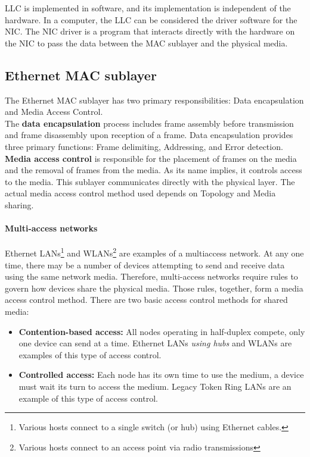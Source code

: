 LLC is implemented in software, and its implementation is independent of the hardware. In a computer, the LLC can be considered the driver software for the NIC. The NIC driver is a program that interacts directly with the hardware on the NIC to pass the data between the MAC sublayer and the physical media.

\subsection{Ethernet MAC sublayer}

The Ethernet MAC sublayer has two primary responsibilities: Data encapsulation and Media Access Control. \\

The \textbf{data encapsulation} process includes frame assembly before transmission and frame disassembly upon reception of a frame. Data encapsulation provides three primary functions: Frame delimiting, Addressing, and Error detection. \\

\textbf{Media access control} is responsible for the placement of frames on the media and the removal of frames from the media. As its name implies, it controls access to the media. This sublayer communicates directly with the physical layer. The actual media access control method used depends on Topology and Media sharing.\\

\paragraph{Multi-access networks} Ethernet LANs\footnote{Various hosts connect to a single switch (or hub) using Ethernet cables.} and WLANs\footnote{Various hosts connect to an access point via radio transmissions} are examples of a multiaccess network. At any one time, there may be a number of devices attempting to send and receive data using the same network media. Therefore, multi-access networks require rules to govern how devices share the physical media. Those rules, together, form a media access control method. There are two basic access control methods for shared media:

\begin{itemize}
\item \textbf{Contention-based access:} All nodes operating in half-duplex compete, only one device can send at a time. Ethernet LANs \emph{using hubs} and WLANs are examples of this type of access control.

\item \textbf{Controlled access:} Each node has its own time to use the medium, a device must wait its turn to access the medium. Legacy Token Ring LANs are an example of this type of access control. 
\end{itemize}

